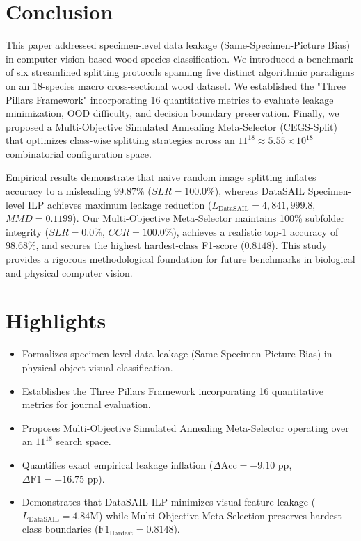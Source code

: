 \section{Conclusion}

This paper addressed specimen-level data leakage (Same-Specimen-Picture Bias) in computer vision-based wood species classification. We introduced a benchmark of six streamlined splitting protocols spanning five distinct algorithmic paradigms on an 18-species macro cross-sectional wood dataset. We established the "Three Pillars Framework" incorporating 16 quantitative metrics to evaluate leakage minimization, OOD difficulty, and decision boundary preservation. Finally, we proposed a Multi-Objective Simulated Annealing Meta-Selector ($\text{CEGS-Split}$) that optimizes class-wise splitting strategies across an $11^{18} \approx 5.55 \times 10^{18}$ combinatorial configuration space.

Empirical results demonstrate that naive random image splitting inflates accuracy to a misleading $99.87\%$ ($SLR = 100.0\%$), whereas DataSAIL Specimen-level ILP achieves maximum leakage reduction ($L_{\text{DataSAIL}} = 4,841,999.8$, $MMD = 0.1199$). Our Multi-Objective Meta-Selector maintains 100\% subfolder integrity ($SLR = 0.0\%$, $CCR = 100.0\%$), achieves a realistic top-1 accuracy of $98.68\%$, and secures the highest hardest-class F1-score ($0.8148$). This study provides a rigorous methodological foundation for future benchmarks in biological and physical computer vision.

\section*{Highlights}
\begin{itemize}
\item Formalizes specimen-level data leakage (Same-Specimen-Picture Bias) in physical object visual classification.
\item Establishes the Three Pillars Framework incorporating 16 quantitative metrics for journal evaluation.
\item Proposes Multi-Objective Simulated Annealing Meta-Selector operating over an $11^{18}$ search space.
\item Quantifies exact empirical leakage inflation ($\Delta \text{Acc} = -9.10\text{ pp}$, $\Delta \text{F1} = -16.75\text{ pp}$).
\item Demonstrates that DataSAIL ILP minimizes visual feature leakage ($L_{\text{DataSAIL}} = 4.84\text{M}$) while Multi-Objective Meta-Selection preserves hardest-class boundaries ($\text{F1}_{\text{Hardest}} = 0.8148$).
\end{itemize}

